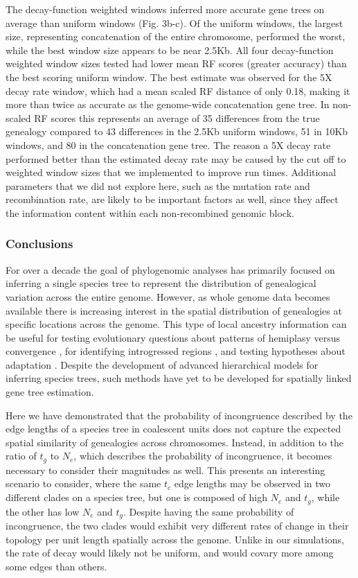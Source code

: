\documentclass[11pt]{article}
\begin{document}
The decay-function weighted windows inferred more accurate gene trees on average than uniform windows (Fig. 3b-c). Of the uniform windows, the largest size, representing concatenation of the entire chromosome, performed the worst, while the best window size appears to be near 2.5Kb. All four decay-function weighted window sizes tested had lower mean RF scores (greater accuracy) than the best scoring uniform window. The best estimate was observed for the 5X decay rate window, which had a mean scaled RF distance of only 0.18, making it more than  twice as accurate as the genome-wide concatenation gene tree. In non-scaled RF scores this represents an average of 35 differences from the true genealogy compared to 43 differences in the 2.5Kb uniform windows, 51 in 10Kb windows, and 80 in the concatenation gene tree. The reason a 5X decay rate performed better than the estimated decay rate may be caused by the cut off to weighted window sizes that we implemented to improve run times. Additional parameters that we did not explore here, such as the mutation rate and recombination rate, are likely to be important factors as well, since they affect the information content within each non-recombined genomic block.


\subsubsection*{Conclusions}
For over a decade the goal of phylogenomic analyses has primarily focused on inferring a single species tree to represent the distribution of genealogical variation across the entire genome. However, as whole genome data becomes available there is increasing interest in the spatial distribution of genealogies at specific locations across the genome. This type of local ancestry information can be useful for testing evolutionary questions about patterns of hemiplasy versus convergence \citep{guerrero_quantifying_2018}, for identifying introgressed regions \citep{fang_estimating_2020}, and testing hypotheses about adaptation \citep{martin_recombination_2019}. Despite the development of advanced hierarchical models for inferring species trees, such methods have yet to be developed for spatially linked gene tree estimation.

Here we have demonstrated that the probability of incongruence described by the edge lengths of a species tree in coalescent units does not capture the expected spatial similarity of genealogies across chromosomes. Instead, in addition to the ratio of $t_g$ to $N_e$, which describes the probability of incongruence, it becomes necessary to consider their magnitudes as well. This presents an interesting scenario to consider, where the same $t_c$ edge lengths may be observed in two different clades on a species tree, but one is composed of high $N_e$ and $t_g$, while the other has low $N_e$ and $t_g$. Despite having the same probability of incongruence, the two clades would exhibit very different rates of change in their topology per unit length spatially across the genome. Unlike in our simulations, the rate of decay would likely not be uniform, and would covary more among some edges than others. 
\end{document}
